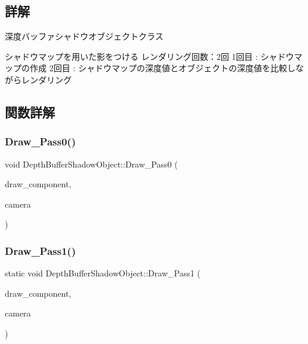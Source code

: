 \subsection{詳解}
深度バッファシャドウオブジェクトクラス 

シャドウマップを用いた影をつける レンダリング回数：2回 1回目 \+: シャドウマップの作成 2回目 \+: シャドウマップの深度値とオブジェクトの深度値を比較しながらレンダリング 

\subsection{関数詳解}
\mbox{\label{class_depth_buffer_shadow_object_a7916c03b90a01c71a9050e721cf6810c}} 
\subsubsection{\texorpdfstring{Draw\+\_\+\+Pass0()}{Draw\_Pass0()}}
{\footnotesize\ttfamily void Depth\+Buffer\+Shadow\+Object\+::\+Draw\+\_\+\+Pass0 (\begin{DoxyParamCaption}\item[{Draw\+Component $\ast$}]{draw\+\_\+component,  }\item[{\mbox{\hyperlink{class_camera}{Camera}} $\ast$}]{camera }\end{DoxyParamCaption})\hspace{0.3cm}{\ttfamily [static]}}

\mbox{\label{class_depth_buffer_shadow_object_a4bf8a72a447aa6ff150f3fef630ab448}} 
\subsubsection{\texorpdfstring{Draw\+\_\+\+Pass1()}{Draw\_Pass1()}}
{\footnotesize\ttfamily static void Depth\+Buffer\+Shadow\+Object\+::\+Draw\+\_\+\+Pass1 (\begin{DoxyParamCaption}\item[{Draw\+Component $\ast$}]{draw\+\_\+component,  }\item[{\mbox{\hyperlink{class_camera}{Camera}} $\ast$}]{camera }\end{DoxyParamCaption})\hspace{0.3cm}{\ttfamily [static]}}

